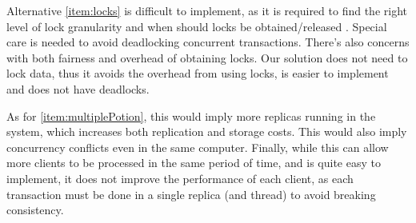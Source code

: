 \documentclass{vldb}
\newcommand{\grumbler}[2]{{\color{red}{\bf #1:} #2}}
\renewcommand{\grumbler}[2]{}
\newcommand{\andre}[1]{\grumbler{andre}{#1}}
\begin{document}
Alternative \ref{item:locks} is difficult to implement, as it is required to find the right level of lock granularity and when should locks be obtained/released \cite{???}. 
Special care is needed to avoid deadlocking concurrent transactions. 
There's also concerns with both fairness and overhead of obtaining locks.
Our solution does not need to lock data, thus it avoids the overhead from using locks, is easier to implement and does not have deadlocks.

As for \ref{item:multiplePotion}, this would imply more replicas running in the system, which increases both replication and storage costs.
This would also imply concurrency conflicts even in the same computer.
Finally, while this can allow more clients to be processed in the same period of time, and is quite easy to implement, it does not improve the performance of each client, as each transaction must be done in a single replica (and thread) to avoid breaking consistency. \andre{Does this need to be explained? The idea here is that we would lose the "write follows reads/writes" property.}

\end{document}
